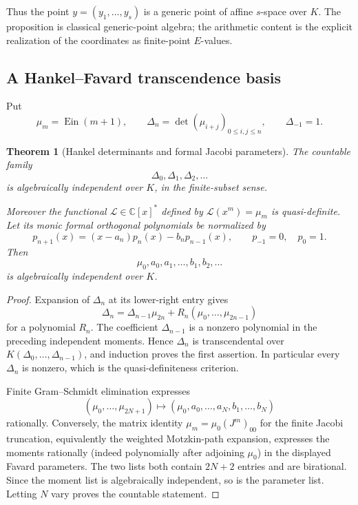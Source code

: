 \documentclass[11pt]{article}
\newtheorem{theorem}{Theorem}[section]
\theoremstyle{definition}
\theoremstyle{remark}
\newcommand{\C}{\mathbb C}
\newcommand{\Ein}{\operatorname{Ein}}
\begin{document}
Thus the point $y=(y_1,\ldots,y_s)$ is a generic point of affine
$s$-space over $K$.  The proposition is classical generic-point algebra;
the arithmetic content is the explicit realization of the coordinates as
finite-point $E$-values.

\subsection{A Hankel--Favard transcendence basis}

Put
\begin{equation}\label{eq:ein-moments}
 \mu_m=\Ein(m+1),\qquad
 \Delta_n=\det(\mu_{i+j})_{0\le i,j\le n},
 \qquad \Delta_{-1}=1.
\end{equation}

\begin{theorem}[Hankel determinants and formal Jacobi parameters]
\label{thm:ein-hankel-jacobi}
The countable family
\[
 \Delta_0,\Delta_1,\Delta_2,\ldots
\]
is algebraically independent over $K$, in the finite-subset sense.

Moreover the functional $\mathcal L\in\C[x]^*$ defined by
$\mathcal L(x^m)=\mu_m$ is quasi-definite.  Let its monic formal orthogonal
polynomials be normalized by
\begin{equation}\label{eq:ein-favard-recurrence}
 p_{n+1}(x)=(x-a_n)p_n(x)-b_np_{n-1}(x),
 \qquad p_{-1}=0,\quad p_0=1.
\end{equation}
Then
\[
 \mu_0,a_0,a_1,\ldots,b_1,b_2,\ldots
\]
is algebraically independent over $K$.
\end{theorem}

\begin{proof}
Expansion of $\Delta_n$ at its lower-right entry gives
\begin{equation}\label{eq:hankel-triangular-expansion}
 \Delta_n=\Delta_{n-1}\mu_{2n}
 +R_n(\mu_0,\ldots,\mu_{2n-1})
\end{equation}
for a polynomial $R_n$.  The coefficient $\Delta_{n-1}$ is a nonzero
polynomial in the preceding independent moments.  Hence $\Delta_n$ is
transcendental over $K(\Delta_0,\ldots,\Delta_{n-1})$, and induction proves
the first assertion.  In particular every $\Delta_n$ is nonzero, which is
the quasi-definiteness criterion.

Finite Gram--Schmidt elimination expresses
\[
 (\mu_0,\ldots,\mu_{2N+1})
 \longmapsto
 (\mu_0,a_0,\ldots,a_N,b_1,\ldots,b_N)
\]
rationally.  Conversely, the matrix identity
$\mu_m=\mu_0(J^m)_{00}$ for the finite Jacobi truncation, equivalently the
weighted Motzkin-path expansion, expresses the moments rationally (indeed
polynomially after adjoining $\mu_0$) in the displayed Favard parameters.
The two lists both contain $2N+2$ entries and are birational.  Since the
moment list is algebraically independent, so is the parameter list.  Letting
$N$ vary proves the countable statement.
\end{proof}
\end{document}
